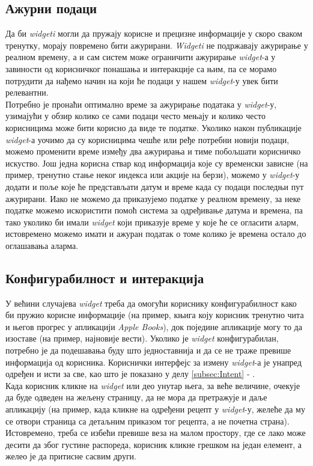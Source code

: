 \documentclass[12pt,oneside]{memoir}
\begin{document}
\subsection{Ажурни подаци}
\indent Да би \textit{widgeti} могли да пружају корисне и прецизне информације у скоро сваком тренутку, морају повремено бити ажурирани. \textit{Widgeti} не подржавају ажурирање у реалном времену, а и сам систем може ограничити ажурирање \textit{widget}-а у завиности од корисничког понашања и интеракције са њим, па се морамо потрудити да нађемо начин на који ће подаци у нашем \textit{widget}-у увек бити релевантни. 
\\
\indent Потребно је пронаћи оптимално време за ажурирање података у \textit{widget}-у, узимајући у обзир колико се сами подаци често мењају и колико често корисницима може бити корисно да виде те податке. Уколико након публикације \textit{widget}-а уочимо да су корисницима чешће или ређе потребни новији подаци, можемо променити време између два ажурирања и тиме побољшати корисничко искуство. Још једна корисна ствар код информација које су временски зависне (на пример, тренутно стање неког индекса или акције на берзи), можемо у \textit{widget}-у додати и поље које ће представљати датум  и време када су подаци последњи пут ажурирани. Иако не можемо да приказујемо податке у реалном времену, за неке податке можемо искористити помоћ система за одређивање датума и времена, па тако уколико би имали \textit{widget} који приказује време у које ће се огласити аларм, истовремено можемо имати и ажуран податак о томе колико је времена остало до оглашавања аларма.  

\subsection{Конфигурабилност и интеракција}
\indent У већини случајева \textit{widget} треба да омогући кориснику конфигурабилност како би пружио корисне информације (на пример, књига коју корисник тренутно чита и његов прогрес у апликацији \textit{Apple Books}), док поједине апликације могу то да изоставе (на пример, најновије вести). Уколико је \textit{widget} конфигурабилан, потребно је да подешавања буду што једноставнија и да се не траже превише информација од корисника. Кориснички интерфејс за измену \textit{widget}-а је унапред одређен и исти за све, као што је показано у делу \ref{subsec:Intent} - .
\\
\indent Када корисник кликне на \textit{widget} или део унутар њега, за веће величине, очекује да буде одведен на жељену страницу, да не мора да претражује и даље апликацију (на пример, када кликне на одређени рецепт у \textit{widget}-у, желеће да му се отвори страница са детаљним приказом тог рецепта, а не почетна страна). Истовремено, треба се избећи превише веза на малом простору, где се лако може десити да због густине распореда, корисник кликне грешком на један елемент, а желео је да притисне сасвим други.
\end{document}
